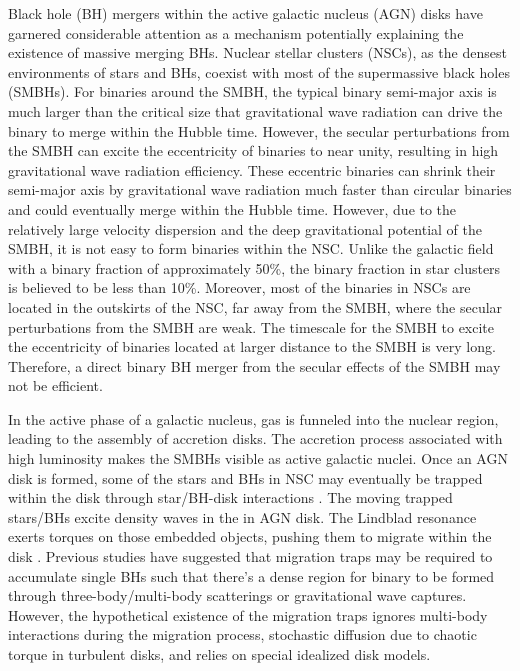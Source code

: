 \documentclass[fleqn,usenatbib]{mnras}
\begin{document}
  Black hole (BH) mergers within the active galactic nucleus (AGN) disks have garnered considerable attention as a mechanism potentially explaining the existence of massive merging BHs\citep{Vokrouhlicky1998,Cuadra2009,McKernan2012,McKernan2014,Bartos2017,McKernan2018,Hoang2018,Secunda2019,Yang2019,Yang2019b,McKernan2020,Tagawa2020,Li2022,Bhaskar2022}. Nuclear stellar clusters (NSCs), as the densest environments of stars and BHs, coexist with most of the supermassive black holes (SMBHs)\citep{Paumard2006,Merritt2010,Genzel2010, kormendy2013}. For binaries around the SMBH, the typical binary semi-major axis is much larger than the critical size that gravitational wave radiation can drive the binary to merge within the Hubble time. However, the secular perturbations from the SMBH can excite the eccentricity of binaries to near unity, resulting in high gravitational wave radiation efficiency\citep{Wen2003,Antonini2015,Antonini2016,Stephan2016,VanLandingham2016,Petrovich2017,Liu2018,Hoang2018,Liu2019, Liu2019b,Bhaskar2022}. These eccentric binaries can shrink their semi-major axis by gravitational wave radiation much faster than circular binaries and could eventually merge within the Hubble time. However, due to the relatively large velocity dispersion and the deep gravitational potential of the SMBH, it is not easy to form binaries within the NSC. Unlike the galactic field with a binary fraction of approximately 50\%, the binary fraction in star clusters is believed to be less than 10\%\citep{Ivanova2005,Hurley2007,Sollima2007}. Moreover, most of the binaries in NSCs are located in the outskirts of the NSC, far away from the SMBH, where the secular perturbations from the SMBH are weak. The timescale for the SMBH to excite the eccentricity of binaries located at larger distance to the SMBH is very long. Therefore, a direct binary BH merger from the secular effects of the SMBH may not be efficient.

In the active phase of a galactic nucleus, gas is funneled into the nuclear region, leading to the assembly of accretion disks. The accretion process associated with high luminosity makes the SMBHs visible as active galactic nuclei. Once an AGN disk is formed, some of the stars and BHs in NSC may eventually be trapped within the disk through star/BH-disk interactions \citep{ Artymowicz1993,Rauch1995,Kennedy2016,Panamarev2018, Macleod2020,Fabj2020,davies2020,Generozov2023,Nasim2023}. The moving trapped stars/BHs excite density waves in the in AGN disk. The Lindblad resonance exerts torques on those embedded objects, pushing them to migrate within the disk \citep{Tanaka2002,Baruteau2010, Baruteau2011}. Previous studies \citep{Bellovary2016,Peng2021} have suggested that migration traps may be required to accumulate single BHs such that there's a dense region for binary to be formed through three-body/multi-body  scatterings \citep{Hills1975,Aarseth1976,Heggie1996,Leigh2018,Zevin2019} or gravitational wave captures\citep{OLeary2009,Kocsis2012,Gondan2018,Samsing2020,LiJ2022}. However, the hypothetical existence of the migration traps ignores multi-body interactions
during the migration process, stochastic diffusion due to chaotic torque in turbulent disks\citep{wu2024}, and relies on special idealized disk models.  
\end{document}
